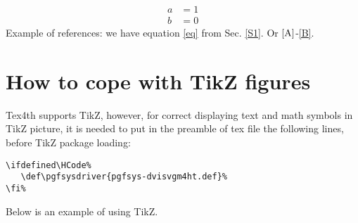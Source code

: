 \documentclass{article}
\def\pgfsysdriver{pgfsys-dvisvgm4ht.def}%
\begin{document}
          \begin{align}
            a & =1\label{A} \\
            b & =0\label{B}
          \end{align}
          Example of references: we have equation \eqref{eq} from
          Sec. \ref{S1}. Or
          $\ref{A}$-\eqref{B}.

          \section{How to cope with TikZ figures}\label{S3}
          Tex4th supports TikZ, however, for correct displaying
          text and math symbols
          in TikZ picture, it is needed to put in the preamble of tex file the
          following lines, before TikZ package loading:
\begin{verbatim}
\ifdefined\HCode%
   \def\pgfsysdriver{pgfsys-dvisvgm4ht.def}%
\fi%
\end{verbatim}

          Below is an example of using TikZ.
\end{document}
